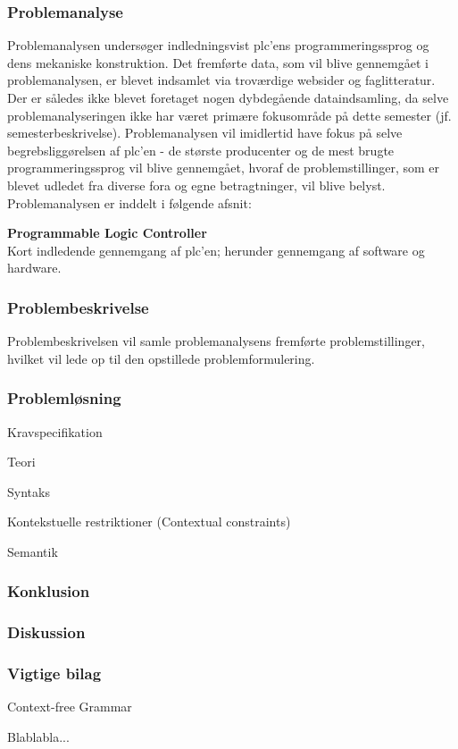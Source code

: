 \label{sec:rapportstruktur}


\subsubsection*{Problemanalyse}
Problemanalysen undersøger indledningsvist \gls{plc}'ens programmeringssprog og dens mekaniske konstruktion. Det fremførte data, som vil blive gennemgået i problemanalysen, er blevet indsamlet via troværdige websider og faglitteratur. Der er således ikke blevet foretaget nogen dybdegående dataindsamling, da selve problemanalyseringen ikke har været primære fokusområde på dette semester (jf. semesterbeskrivelse). Problemanalysen vil imidlertid have fokus på selve begrebsliggørelsen af \gls{plc}'en - de største producenter og de mest brugte programmeringssprog vil blive gennemgået, hvoraf de problemstillinger, som er blevet udledet fra diverse fora og egne betragtninger, vil blive belyst. Problemanalysen er inddelt i følgende afsnit:

\begin{itemize_small}
    \item \textbf{Programmable Logic Controller} \\
    Kort indledende gennemgang af \gls{plc}'en; herunder gennemgang af software og hardware.
\end{itemize_small}

\subsubsection*{Problembeskrivelse}
Problembeskrivelsen vil samle problemanalysens fremførte problemstillinger, hvilket vil lede op til den opstillede problemformulering.

\subsubsection*{Problemløsning}

\begin{itemize_small}
    \item Kravspecifikation
    \item Teori
    \item Syntaks
    \item Kontekstuelle restriktioner (Contextual constraints)
    \item Semantik
\end{itemize_small}

\subsubsection*{Konklusion}

\subsubsection*{Diskussion}

\subsubsection*{Vigtige bilag}
\begin{itemize_small}
    \item Context-free Grammar
    \item Blablabla...
\end{itemize_small}
